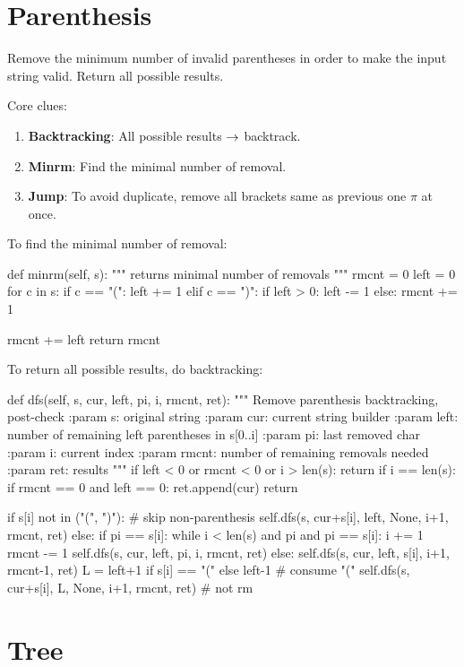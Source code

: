 \section{Parenthesis}
 Remove the minimum number of invalid parentheses in order to make the input string valid. Return all possible results.

Core clues:
\begin{enumerate}
\item \textbf{Backtracking}: All possible results $\rightarrow$ backtrack. 
\item \textbf{Minrm}: Find the minimal number of removal.
\item \textbf{Jump}: To avoid duplicate, remove all brackets same as previous one $\pi$ at once.
\end{enumerate}

To find the minimal number of removal:
\begin{python}
def minrm(self, s):
    """
    returns minimal number of removals
    """
    rmcnt = 0
    left = 0
    for c in s:
        if c == "(":
            left += 1
        elif c == ")":
            if left > 0:
                left -= 1
            else:
                rmcnt += 1

    rmcnt += left
    return rmcnt
\end{python}
To return all possible results, do backtracking: 
\begin{python}
def dfs(self, s, cur, left, pi, i, rmcnt, ret):
  """
  Remove parenthesis
  backtracking, post-check
  :param s: original string
  :param cur: current string builder
  :param left: number of remaining left parentheses in s[0..i]
  :param pi: last removed char
  :param i: current index
  :param rmcnt: number of remaining removals needed
  :param ret: results
  """
  if left < 0 or rmcnt < 0 or i > len(s):
    return
  if i == len(s):
    if rmcnt == 0 and left == 0:
      ret.append(cur)
    return

  if s[i] not in ("(", ")"):  # skip non-parenthesis
    self.dfs(s, cur+s[i], left, None, i+1, rmcnt, ret)
  else:
    if pi == s[i]:
      while i < len(s) and pi and pi == s[i]: 
        i += 1
        rmcnt -= 1
      self.dfs(s, cur, left, pi, i, rmcnt, ret)
    else:
      self.dfs(s, cur, left, s[i], i+1, rmcnt-1, ret)
      L = left+1 if s[i] == "(" else left-1  # consume "("
      self.dfs(s, cur+s[i], L, None, i+1, rmcnt, ret)  # not rm
\end{python}
\section{Tree}
